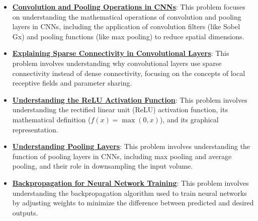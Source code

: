 \documentclass{article}%
\begin{document}
\begin{itemize}[leftmargin=*]
\item \href{https://purdue.brightspace.com/d2l/common/assets/pdfjs-d2l-dist/1.0.14-legacy/web/viewer.html?file=\%2Fcontent\%2Fenforced\%2F1095467-wl.202510.CS.24300.001\%2F09L1-cnn.pdf\%3Fou\%3D1095467\&lang=en-us\&container=d2l-fileviewer-rendered-pdf\&fullscreen=d2l-fileviewer-rendered-pdf-dialog\&height=667#page=6}{\textbf{Convolution and Pooling Operations in CNNs}}: This problem focuses on understanding the mathematical operations of convolution and pooling layers in CNNs, including the application of convolution filters (like Sobel Gx) and pooling functions (like max pooling) to reduce spatial dimensions.%
\item \href{https://purdue.brightspace.com/d2l/common/assets/pdfjs-d2l-dist/1.0.14-legacy/web/viewer.html?file=\%2Fcontent\%2Fenforced\%2F1095467-wl.202510.CS.24300.001\%2F09L1-cnn.pdf\%3Fou\%3D1095467\&lang=en-us\&container=d2l-fileviewer-rendered-pdf\&fullscreen=d2l-fileviewer-rendered-pdf-dialog\&height=667#page=10}{\textbf{Explaining Sparse Connectivity in Convolutional Layers}}: This problem involves understanding why convolutional layers use sparse connectivity instead of dense connectivity, focusing on the concepts of local receptive fields and parameter sharing.%
\item \href{https://purdue.brightspace.com/d2l/common/assets/pdfjs-d2l-dist/1.0.14-legacy/web/viewer.html?file=\%2Fcontent\%2Fenforced\%2F1095467-wl.202510.CS.24300.001\%2F09L1-cnn.pdf\%3Fou\%3D1095467\&lang=en-us\&container=d2l-fileviewer-rendered-pdf\&fullscreen=d2l-fileviewer-rendered-pdf-dialog\&height=667#page=13}{\textbf{Understanding the ReLU Activation Function}}: This problem involves understanding the rectified linear unit (ReLU) activation function, its mathematical definition ($f(x) = \max(0, x)$), and its graphical representation.%
\item \href{https://purdue.brightspace.com/d2l/common/assets/pdfjs-d2l-dist/1.0.14-legacy/web/viewer.html?file=\%2Fcontent\%2Fenforced\%2F1095467-wl.202510.CS.24300.001\%2F09L1-cnn.pdf\%3Fou\%3D1095467\&lang=en-us\&container=d2l-fileviewer-rendered-pdf\&fullscreen=d2l-fileviewer-rendered-pdf-dialog\&height=667#page=14}{\textbf{Understanding Pooling Layers}}: This problem involves understanding the function of pooling layers in CNNs, including max pooling and average pooling, and their role in downsampling the input volume.%
\item \href{https://purdue.brightspace.com/d2l/common/assets/pdfjs-d2l-dist/1.0.14-legacy/web/viewer.html?file=\%2Fcontent\%2Fenforced\%2F1095467-wl.202510.CS.24300.001\%2F09L1-cnn.pdf\%3Fou\%3D1095467\&lang=en-us\&container=d2l-fileviewer-rendered-pdf\&fullscreen=d2l-fileviewer-rendered-pdf-dialog\&height=667#page=16}{\textbf{Backpropagation for Neural Network Training}}: This problem involves understanding the backpropagation algorithm used to train neural networks by adjusting weights to minimize the difference between predicted and desired outputs.%

\end{itemize}
\end{document}
